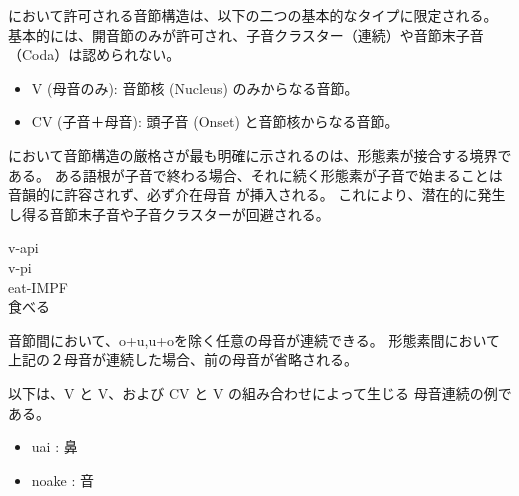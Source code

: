 \langname において許可される音節構造は、以下の二つの基本的なタイプに限定される。
基本的には、開音節のみが許可され、子音クラスター（連続）や音節末子音（Coda）は認められない。

\begin{itemize}
    \item {V (母音のみ)}: 音節核 (Nucleus) のみからなる音節。
    \item {CV (子音＋母音)}: 頭子音 (Onset) と音節核からなる音節。
\end{itemize}

\langname において音節構造の厳格さが最も明確に示されるのは、形態素が接合する境界である。
ある語根が子音で終わる場合、それに続く形態素が子音で始まることは音韻的に許容されず、必ず介在母音
が挿入される。
これにより、潜在的に発生し得る音節末子音や子音クラスターが回避される。

\begin{exe}
    \ex \glll v-api \\
    v-pi \\
    eat-IMPF \\
        \glt 食べる
\end{exe}

音節間において、o+u,u+oを除く任意の母音が連続できる。
形態素間において上記の２母音が連続した場合、前の母音が省略される。

以下は、{V} と {V}、および {CV} と {V} の組み合わせによって生じる
母音連続の例である。

\begin{itemize}
    \item uai : 鼻
    \item noake : 音
\end{itemize}